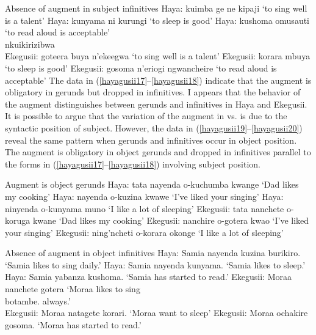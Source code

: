 \documentclass[output=paper]{langscibook}
\begin{document}
\ea Absence of augment in subject infinitives\smallskip
\label{hayagusii18}
  \ea\label{hayagusii18a} 	Haya:\hphantom{isit}	    	kuimba ge ne kipaji\hphantom{vanchetre}			‘to sing well is a talent’
  \ex\label{hayagusii18b} 	Haya:\hphantom{isit}	    	kunyama ni kurungi\hphantom{iancheire}			‘to sleep is good’
  \ex\label{hayagusii18c} 	\gll Haya:\hphantom{isit}	    	{kushoma omusauti}\hphantom{wanchetre} 	{‘to read aloud is acceptable’}\\
                            {}  nkuikirizibwa {}\\
  \ex\label{hayagusii18d} 	Ekegusii: 	goteera buya n’ekeegwa\hphantom{heire}		‘to sing well is a talent'
  \ex\label{hayagusii18e} 	Ekegusii: 	korara mbuya\hphantom{riogi wancheire}				‘to sleep is good’
  \ex\label{hayagusii18f} 	Ekegusii: 	gosoma n’eriogi ngwancheire		‘to read aloud is acceptable’
  \z
\z
The data in (\ref{hayagusii17}--\ref{hayagusii18}) indicate that the augment is obligatory in gerunds but dropped in infinitives. I appears that the behavior of the augment distinguishes between gerunds and infinitives in Haya and Ekegusii. It is possible to argue that the variation of the augment in  vs.  is due to the syntactic position of subject. However, the data in (\ref{hayagusii19}--\ref{hayagusii20}) reveal the same pattern when gerunds and infinitives occur in object position. The augment is obligatory in object gerunds and dropped in infinitives parallel to the forms in (\ref{hayagusii17}--\ref{hayagusii18}) involving subject position.

\ea Augment is object gerunds\smallskip
\label{hayagusii19}
  \ea\label{hayagusii19a} 	Haya:\hphantom{isit}		tata nayenda o-kuchumba kwange 	‘Dad likes my cooking’
  \ex\label{hayagusii19b} 	Haya:\hphantom{isit}		nayenda o-kuzina kwawe\hphantom{i kwangi}		‘I’ve liked your singing’
  \ex\label{hayagusii19c} 	Haya:\hphantom{isit}		ninyenda o-kunyama muno\hphantom{wange}		‘I like a lot of sleeping’
  \ex\label{hayagusii19d} 	Ekegusii: 	tata nanchete o-koruga kwane\hphantom{nge} 		‘Dad likes my cooking’
  \ex\label{hayagusii19e} 	Ekegusii: 	nanchire o-gotera kwao\hphantom{ia kwange}		‘I’ve liked your singing’
  \ex\label{hayagusii19f} 	Ekegusii: 	ning’ncheti o-korara okonge\hphantom{tange}		‘I like a lot of sleeping’
  \z
\z

\ea Absence of augment in object infinitives\smallskip
\label{hayagusii20}
  \ea\label{hayagusii20a} 	Haya:\hphantom{isit} 		Samia nayenda kuzina burikiro. 	‘Samia likes to sing daily.’
  \ex\label{hayagusii20b}	Haya:\hphantom{isit} 		Samia nayenda kunyama.\hphantom{rikiro.} 		‘Samia likes to sleep.’
  \ex\label{hayagusii20c} 	Haya:\hphantom{isit} 		Samia yabanza kushoma.\hphantom{iiikiro.} 		‘Samia has started to read.’
  \ex\label{hayagusii20d} 	\gll Ekegusii: 	{Moraa nanchete gotera}\hphantom{burtktro} 	{‘Moraa likes to sing}\\
                                {} botambe. {always.’}\\
  \ex\label{hayagusii20e} 	Ekegusii: 	Moraa natagete korari.\hphantom{burokiro}		‘Moraa want to sleep’
  \ex\label{hayagusii20f} 	Ekegusii: 	Moraa ochakire gosoma.\hphantom{orikiro} 		‘Moraa has started to read.’
  \z
\z
\end{document}

